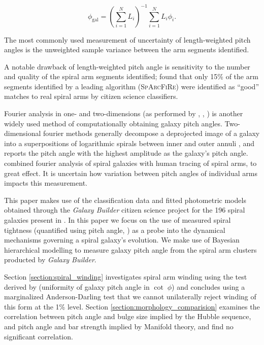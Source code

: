 \begin{equation}
  \phi_\mathrm{gal} = \left(\sum_{i=1}^{N}L_i\right)^{-1}\sum_{i=1}^{N}L_i \phi_i.
\end{equation}

The most commonly used measurement of uncertainty of length-weighted pitch angles is the unweighted sample variance between the arm segments identified.

A notable drawback of length-weighted pitch angle is sensitivity to the number and quality of the spiral arm segments identified; \citet{2017MNRAS.472.2263H} found that only 15\% of the arm segments identified by a leading algorithm (\textsc{SpArcFiRe}) were identified as ``good'' matches to real spiral arms by citizen science classifiers.

Fourier analysis in one- and two-dimensions (as performed by \citealt{2019arXiv190804246D}, \citealt{2012ApJS..199...33D}, \citealt{2018MNRAS.474.2594M}) is another widely used method of computationally obtaining galaxy pitch angles. Two-dimensional fourier methods generally decompose a deprojected image of a galaxy into a superpositions of logarithmic spirals between inner and outer annuli \citep{2012ApJS..199...33D}, and reports the pitch angle with the highest amplitude as the galaxy's pitch angle. \citet{2020MNRAS.493.3854H} combined fourier analysis of spiral galaxies with human tracing of spiral arms, to great effect. It is uncertain how variation between pitch angles of individual arms impacts this measurement.

This paper makes use of the classification data and fitted photometric models obtained through the \textit{Galaxy Builder} citizen science project for the 196 spiral galaxies present in \Lingard. In this paper we focus on the use of measured spiral tightness (quantified using pitch angle, \citealt{1987gady.book.....B}) as a probe into the dynamical mechanisms governing a spiral galaxy's evolution. We make use of Bayesian hierarchical modelling to measure galaxy pitch angle from the spiral arm clusters producted by \textit{Galaxy Builder}.

Section \ref{section:spiral_winding} investigates spiral arm winding using the test derived by \cite{2019arXiv190910291P} (uniformity of galaxy pitch angle in $\cot\;\phi$) and concludes using a marginalized Anderson-Darling test that we cannot unilaterally reject winding of this form at the 1\% level. Section \ref{section:morphology_comparision} examines the correlation between pitch angle and bulge size implied by the Hubble sequence, and pitch angle and bar strength implied by Manifold theory, and find no significant correlation.
